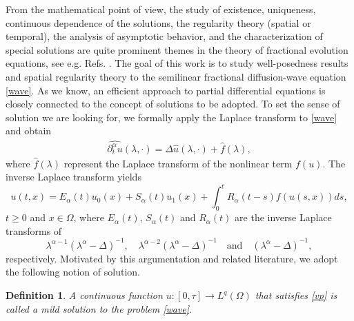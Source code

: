 \documentclass[12pt,reqno]{amsart}
\newtheorem{de}{Definition}
\begin{document}
From the mathematical point of view, the study of existence, uniqueness, continuous dependence of the solutions, the regularity theory (spatial or temporal), the analysis of asymptotic behavior, and the characterization of special solutions are quite prominent themes in the theory of fractional evolution equations, see e.g. Refs. \cite{deAnd, B1, B2, AF, AV, ACCM, F1, F2, H, KKL, MP}. The goal of this work is to study well-posedness results and spatial regularity theory to the semilinear fractional diffusion-wave equation \eqref{wave}.  As we know, an efficient approach to partial differential equations is closely connected to the concept of solutions to be adopted.  To set the sense of solution we are looking for, we formally apply the Laplace transform to \eqref{wave} and obtain 
\begin{eqnarray*}
\widehat{\partial_t^{\alpha}u}(\lambda,\cdot)=\Delta\widehat{u}(\lambda,\cdot)+ \widehat{f}(\lambda),
\end{eqnarray*}
where $\widehat{f}(\lambda)$ represent the Laplace transform of the nonlinear term $f(u)$.  The inverse Laplace transform yields
\begin{equation}\label{vp}
u(t,x)= E_{\alpha}(t)u_0(x)+S_{\alpha}(t )u_1(x)+\int_{0}^{t}R_{\alpha}(t-s)f(u(s,x))ds, 
\end{equation}
$t\ge0$ and $x\in\Omega$, where $E_{\alpha}(t)$, $S_{\alpha}(t)$ and $R_{\alpha}(t)$ are the inverse Laplace transforms of $$\lambda^{\alpha-1}(\lambda^{\alpha}-\Delta)^{-1},\quad \lambda^{\alpha-2}(\lambda^{\alpha}-\Delta)^{-1}\quad \mbox{and}\quad  (\lambda^{\alpha}-\Delta)^{-1},$$ respectively. Motivated by this argumentation and related literature, we adopt the following notion of solution.
			
\begin{de}\label{ms}
A continuous function $u: [0,\tau ] \rightarrow L^{q}(\Omega)$ that satisfies \eqref{vp} is called a mild solution to the problem \eqref{wave}.
\end{de}
			
			
\end{document}
